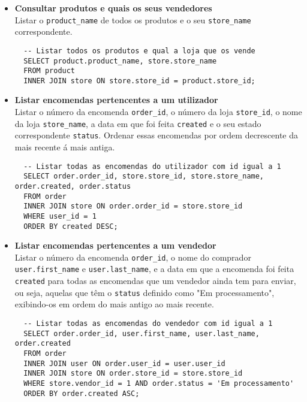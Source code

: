 \begin{itemize}
  \item \textbf{Consultar produtos e quais os seus vendedores}\\ 
    Listar o \texttt{product\_name} de todos os produtos e o seu \texttt{store\_name} correspondente.
    \vspace{10pt}
    \begin{lstlisting}
  -- Listar todos os produtos e qual a loja que os vende
  SELECT product.product_name, store.store_name
  FROM product
  INNER JOIN store ON store.store_id = product.store_id;
      \end{lstlisting}

  \item \textbf{Listar encomendas pertencentes a um utilizador}\\ 
    Listar o número da encomenda \texttt{order\_id}, o número da loja \texttt{store\_id}, o nome da loja \texttt{store\_name}, a data em que foi feita \texttt{created} e o seu estado correspondente \texttt{status}. Ordenar essas encomendas por ordem decrescente da mais recente á mais antiga.
    \vspace{10pt}
    \begin{lstlisting}
  -- Listar todas as encomendas do utilizador com id igual a 1
  SELECT order.order_id, store.store_id, store.store_name, order.created, order.status
  FROM order
  INNER JOIN store ON order.order_id = store.store_id
  WHERE user_id = 1
  ORDER BY created DESC;
      \end{lstlisting}

  \item \textbf{Listar encomendas pertencentes a um vendedor}\\ 
    Listar o número da encomenda \texttt{order\_id}, o nome do comprador \texttt{user.first\_name} e \texttt{user.last\_name}, e a data em que a encomenda foi feita \texttt{created} para todas as encomendas que um vendedor ainda tem para enviar, ou seja, aquelas que têm o \texttt{status} definido como "Em processamento", exibindo-os em ordem do mais antigo ao mais recente.
      \vspace{10pt}
      \begin{lstlisting}
  -- Listar todas as encomendas do vendedor com id igual a 1
  SELECT order.order_id, user.first_name, user.last_name, order.created
  FROM order
  INNER JOIN user ON order.user_id = user.user_id
  INNER JOIN store ON order.store_id = store.store_id
  WHERE store.vendor_id = 1 AND order.status = 'Em processamento'
  ORDER BY order.created ASC;
        \end{lstlisting}

\end{itemize}






